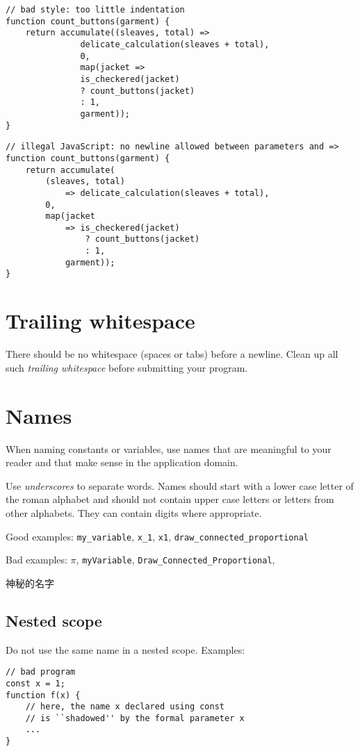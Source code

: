\newpage
\begin{lstlisting}
// bad style: too little indentation
function count_buttons(garment) {
    return accumulate((sleaves, total) =>
               delicate_calculation(sleaves + total),
               0, 
               map(jacket =>
               is_checkered(jacket)
               ? count_buttons(jacket)
               : 1,
               garment));
}
\end{lstlisting}
\begin{lstlisting}
// illegal JavaScript: no newline allowed between parameters and =>
function count_buttons(garment) {
    return accumulate(
        (sleaves, total) 
            => delicate_calculation(sleaves + total),
        0,
        map(jacket 
            => is_checkered(jacket)
                ? count_buttons(jacket)
                : 1,
            garment));
}
\end{lstlisting}

\section*{Trailing whitespace}

There should be no whitespace (spaces or tabs) before a newline.
Clean up all such \emph{trailing whitespace} before submitting your program.

\section*{Names}

When naming constants or variables, use names that are meaningful to your
reader and that make sense in the application domain.

Use \emph{underscores} to separate words. Names should start with
a lower case letter of the roman alphabet and should not contain upper case letters or
letters from other alphabets. They can contain digits where appropriate.

Good examples: \lstinline{my_variable}, \lstinline{x_1}, \lstinline{x1},
\lstinline{draw_connected_proportional}

Bad examples: $\pi$, \lstinline{myVariable}, \lstinline{Draw_Connected_Proportional},
\begin{CJK*}{UTF8}{gbsn}
神秘的名字
\end{CJK*}

\subsection*{Nested scope}
Do not use the same name in a nested scope. Examples:
\begin{lstlisting}
// bad program
const x = 1;
function f(x) {
    // here, the name x declared using const
    // is ``shadowed'' by the formal parameter x
    ...
}
\end{lstlisting}

